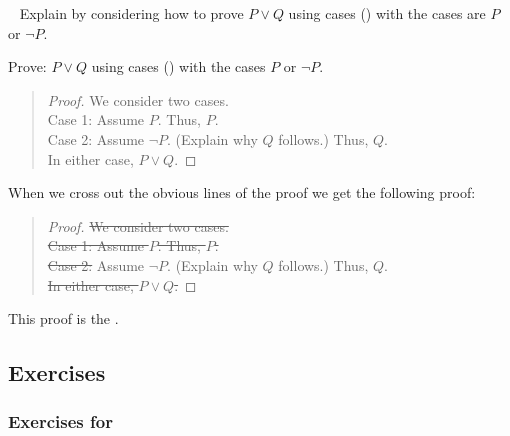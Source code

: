 \begin{exam}
\label{exam_implication_vs_cases_proof_or}  
~    
    Explain  by considering how to prove $P \lor Q$ using cases () with the cases are $P$ or $\neg P$.
        \begin{soln}
            Prove: $P \lor Q$ using cases () with the cases $P$ or $\neg P$.

            \begin{quote}
            \begin{proof}
                We consider two cases. \\
                Case 1: Assume $P$.  Thus, $P$.\\
                Case 2: Assume $\neg P$.  (Explain why $Q$ follows.) Thus, $Q$.\\
                In either case, $P \lor Q$.
            \end{proof}
            \end{quote}

            When we cross out the obvious lines of the proof we get the following proof:

            \begin{quote}
            \begin{proof}
                \st{We consider two cases.} \\  %
                \st{Case 1: Assume $P$.  Thus, $P$.}\\
                \st{Case 2:} Assume $\neg P$.  (Explain why $Q$ follows.) Thus, $Q$.\\
                \st{In either case, $P \lor Q$.}
            \end{proof}
            \end{quote}
            
            This proof is the .
        \end{soln}
\end{exam}


\subsection{Exercises}  


\subsubsection*{Exercises for  \subifthen}

